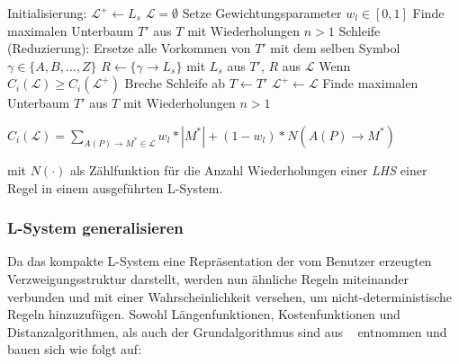 \begin{algorithm}[caption={Erstellen eines kompakten L-Systems mit Gewichtung $w_l$}, label={alg3}]
Initialisierung:
$\mathcal{L}^+ \leftarrow L_s$
$\mathcal{L}=\emptyset$
Setze Gewichtungsparameter $w_l \in [0,1]$
Finde maximalen Unterbaum $T'$ aus $T$ mit Wiederholungen $n>1$
Schleife (Reduzierung):
Ersetze alle Vorkommen von $T'$ mit dem selben Symbol $\gamma \in \{A,B,\dots,Z\}$
$R \leftarrow \{\gamma \rightarrow L_s\}$ mit $L_s$ aus $T'$, $R$ aus $\mathcal{L}$
Wenn $C_i(\mathcal{L}) \geq C_i(\mathcal{L}^+)$
Breche Schleife ab
$T \leftarrow T'$
$\mathcal{L}^+ \leftarrow \mathcal{L}$
Finde maximalen Unterbaum $T'$ aus $T$ mit Wiederholungen $n>1$
\end{algorithm}

\begin{algorithm}[caption={Kostenfunktion $C_i$ mit Gewichtung $w_l$}, label={alg4}]
$C_i(\mathcal{L})= \sum\limits_{A(P) \rightarrow M^* \in \mathcal{L}} w_l * |M^*| + (1 - w_l) * N(A(P)\rightarrow M^*)$
\end{algorithm}
mit $N(\cdot)$ als Zählfunktion für die Anzahl Wiederholungen einer \textit{LHS} einer Regel in einem
ausgeführten L-System.

\subsubsection*{L-System generalisieren}
Da das kompakte L-System eine Repräsentation der vom Benutzer erzeugten Verzweigungsstruktur darstellt, werden
nun ähnliche Regeln miteinander verbunden und mit einer Wahrscheinlichkeit versehen, um nicht-deterministische
Regeln hinzuzufügen.
Sowohl Längenfunktionen, Kostenfunktionen und Distanzalgorithmen, als auch der Grundalgorithmus sind aus ~\cite{guo_2020}
entnommen und bauen sich wie folgt auf:

